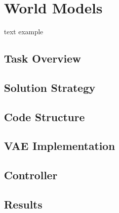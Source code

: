 \documentclass[10pt,a4paper]{article}
\begin{document}
\section{World Models}
text example \cite{DBLP:journals/corr/abs-1803-10122} \cite{ctallec-wm}
 
\subsection{Task Overview}
\newpage

\subsection{Solution Strategy}
\newpage

\subsection{Code Structure}
\newpage

\subsection{VAE Implementation}
\newpage


\subsection*{Controller}
\newpage

\subsection{Results}
\newpage

\newpage


\printbibliography

\end{document}
